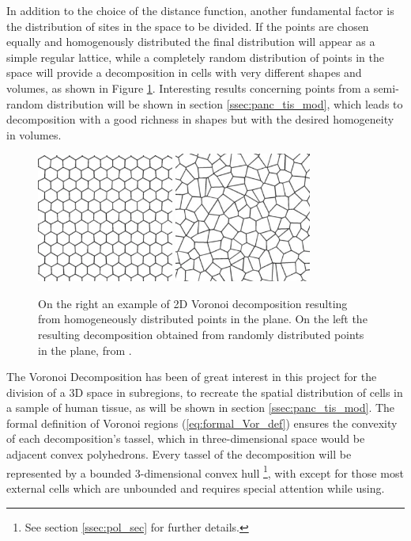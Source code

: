 In addition to the choice of the distance function, another fundamental factor is the distribution of sites in the space to be divided. If the points are chosen equally and homogenously distributed the final distribution will appear as a simple regular lattice, while a completely random distribution of points in the space will provide a decomposition in cells with very different shapes and volumes, as shown in Figure \ref{fig:diff_pt}. Interesting results concerning points from a semi-random distribution will be shown in section \ref{ssec:panc_tis_mod}, which leads to decomposition with a good richness in shapes but with the desired homogeneity in volumes.

\begin{figure}
    \centering
    \includegraphics[width = 0.4\textwidth]{images/reg_pt}
    \includegraphics[width = 0.4\textwidth]{images/ran_pt}
    \caption{On the right an example of 2D Voronoi decomposition resulting from homogeneously distributed points in the plane. On the left the resulting decomposition obtained from randomly distributed points in the plane, from \cite{ALSAYEDNOOR201644}.}
    \label{fig:diff_pt}
\end{figure}

The Voronoi Decomposition has been of great interest in this project for the division of a 3D space in subregions, to recreate the spatial distribution of cells in a sample of human tissue, as will be shown in section \ref{ssec:panc_tis_mod}. The formal definition of Voronoi regions (\ref{eq:formal_Vor_def}) ensures the convexity of each decomposition's tassel, which in three-dimensional space would be adjacent convex polyhedrons. Every tassel of the decomposition will be represented by a bounded 3-dimensional convex hull \footnote{See section \ref{ssec:pol_sec} for further details.}, with except for those most external cells which are unbounded and requires special attention while using.

